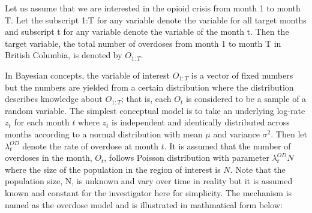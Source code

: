 \documentclass[12pt]{article}
\begin{document}
Let us assume that we are interested in the opioid crisis from month 1 to month T.  Let the subscript 1:T for any variable denote the variable for all target months and subscript t for any variable denote the variable of the month t. Then the target variable, the total number of overdoses from month 1 to month T  in British Columbia, is denoted by $O_{1:T}$.

In Bayesian concepts, the variable of interest $O_{1:T}$ is a vector of fixed numbers but the numbers are yielded from a certain distribution where the distribution describes knowledge about $O_{1:T}$; that is, each $O_t$ is considered to be a sample of a random variable. 
The simplest conceptual model is to take an underlying log-rate $z_t$ for each month $t$ where $z_t$ is independent and identically distributed across months according to a normal distribution with mean $\mu$ and variance $\sigma^2$. \cite{Irvine:modelling} Then let $\lambda_{t}^{OD}$ denote the rate of overdose at month $t$. It is assumed that the number of overdoses in the month, $O_t$, follows Poisson distribution with parameter $\lambda_{t}^{OD}N$ where the size of the population in the region of interest is $N$. Note that the population size, N, is unknown and vary over time in reality but it is assumed known and constant for the investigator here for simplicity. The mechanism is named as the overdose model  and is illustrated in mathmatical form below:
\end{document}
